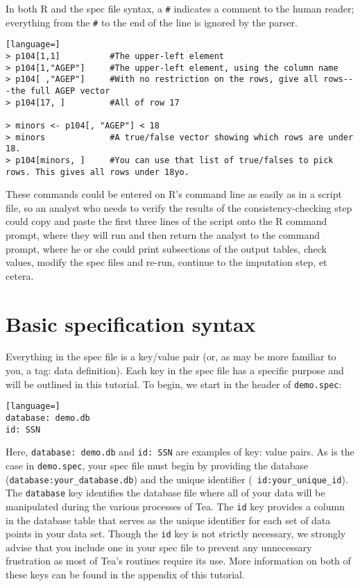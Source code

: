 \documentclass{article}
\begin{document}
In both R and the spec file syntax, a {\tt \#} indicates a comment to the human
reader; everything from the {\tt \#} to the end of the line is ignored by the parser.

\begin{lstlisting}[language=]
> p104[1,1]          #The upper-left element
> p104[1,"AGEP"]     #The upper-left element, using the column name
> p104[ ,"AGEP"]     #With no restriction on the rows, give all rows---the full AGEP vector
> p104[17, ]         #All of row 17

> minors <- p104[, "AGEP"] < 18
> minors             #A true/false vector showing which rows are under 18.
> p104[minors, ]     #You can use that list of true/falses to pick rows. This gives all rows under 18yo.
\end{lstlisting}

These commands could be entered on R's command line as easily as in a script file, so an
analyst who needs to verify the results of the consistency-checking step could copy and
paste the first three lines of the script onto the R command prompt, where they will run and
then return the analyst to the command prompt, where he or she could print subsections of
the output tables, check values, modify the spec files and re-run, continue to the
imputation step, et cetera.


\section{Basic specification syntax}
Everything in the spec file is a key/value pair (or, as may be more familiar to 
you, a tag: data definition). Each key in the spec file has a specific purpose and 
will be outlined in this tutorial.
To begin, we start in the header of {\tt demo.spec}:

\begin{lstlisting}[language=]
database: demo.db
id: SSN
\end{lstlisting}

Here, {\tt database: demo.db} and {\tt id: SSN} are examples of key: value pairs.
As is the case in {\tt demo.spec}, your spec file must begin by providing the
database ({\tt database:your\_database.db}) and the unique identifier ({\tt
id:your\_unique\_id}). The {\tt database} key identifies the database file
where all of your data will be manipulated during the various processes of Tea.
The {\tt id} key provides a column in the database table that serves as the unique
identifier for each set of data points in your data set. Though the {\tt id} key is
not strictly necessary, we strongly advise that you include one in your spec file to
prevent any unnecessary frustration as most of Tea's routines require its use. More
information on both of these keys can be found in the appendix of this tutorial.\\
\end{document}
